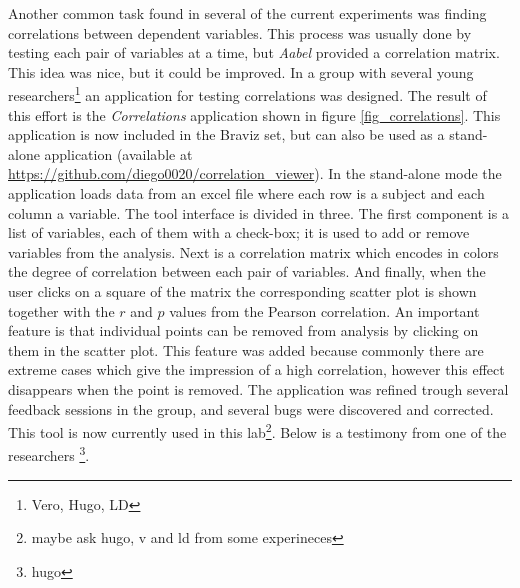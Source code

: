 Another common task found in several of the current experiments was finding correlations between dependent variables. This process was usually done by testing each pair of variables at a time, but \emph{Aabel} provided a correlation matrix. This idea was nice, but it could be improved. In a group with several young researchers\footnote{Vero, Hugo, LD} an application for testing correlations was designed. The result of this effort is the \emph{Correlations} application shown in figure \ref{fig_correlations}. This application is now included in the Braviz set, but can also be used as a stand-alone application (available at \url{https://github.com/diego0020/correlation_viewer}). In the stand-alone mode the application loads data from an excel file where each row is a subject and each column a variable. The tool interface is divided in three. The first component is a list of variables, each of them with a check-box; it is used to add or remove variables from the analysis. Next is a correlation matrix which encodes in colors the degree of correlation between each pair of variables. And finally, when the user clicks on a square of the matrix the corresponding scatter plot is shown together with the $r$ and $p$ values from the Pearson correlation. An important feature is that individual points can be removed from analysis by clicking on them in the scatter plot. This feature was added because commonly there are extreme cases which give the impression of a high correlation, however this effect disappears when the point is removed. The application was refined trough several feedback sessions in the group, and several bugs were discovered and corrected.  This tool is now currently used in this lab\footnote{maybe ask hugo, v and ld from some experineces}. Below is a testimony from one of the researchers \footnote{hugo}.

